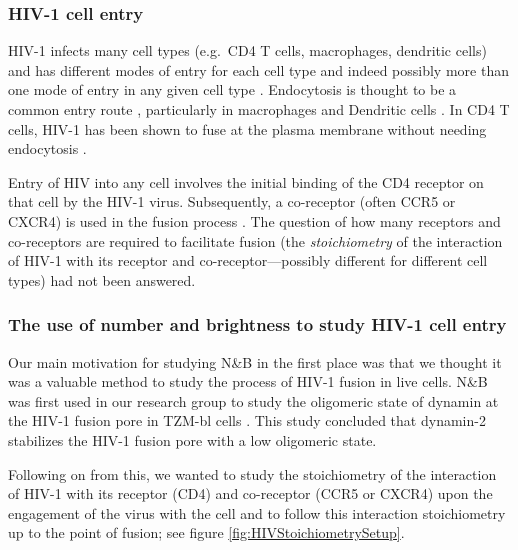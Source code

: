 \documentclass[12pt,]{book}
\theoremstyle{definition}
\theoremstyle{definition}
\theoremstyle{definition}
\theoremstyle{remark}
\begin{document}
\subsubsection{HIV-1 cell entry}\label{hiv-1-cell-entry}

HIV-1 infects many cell types (e.g.~CD4 T cells, macrophages, dendritic
cells) and has different modes of entry for each cell type and indeed
possibly more than one mode of entry in any given cell type
\citep{Jakobsdottir}. Endocytosis is thought to be a common entry route
\citep{Miyauchi}, particularly in macrophages \citep{Marechal} and
Dendritic cells \citep{Mnager}. In CD4 T cells, HIV-1 has been shown to
fuse at the plasma membrane without needing endocytosis \citep{Herold}.

Entry of HIV into any cell involves the initial binding of the CD4
receptor on that cell by the HIV-1 virus. Subsequently, a co-receptor
(often CCR5 or CXCR4) is used in the fusion process
\citep{Jakobsdottir}. The question of how many receptors and
co-receptors are required to facilitate fusion (the \emph{stoichiometry}
of the interaction of HIV-1 with its receptor and co-receptor---possibly
different for different cell types) had not been answered.

\subsubsection{The use of number and brightness to study HIV-1 cell
entry}\label{the-use-of-number-and-brightness-to-study-hiv-1-cell-entry}

Our main motivation for studying N\&B in the first place was that we
thought it was a valuable method to study the process of HIV-1 fusion in
live cells. N\&B was first used in our research group to study the
oligomeric state of dynamin at the HIV-1 fusion pore in TZM-bl cells
\citep{DanDynamin}. This study concluded that dynamin-2 stabilizes the
HIV-1 fusion pore with a low oligomeric state.

Following on from this, we wanted to study the stoichiometry of the
interaction of HIV-1 with its receptor (CD4) and co-receptor (CCR5 or
CXCR4) upon the engagement of the virus with the cell and to follow this
interaction stoichiometry up to the point of fusion; see figure
\ref{fig:HIVStoichiometrySetup}.
\end{document}
